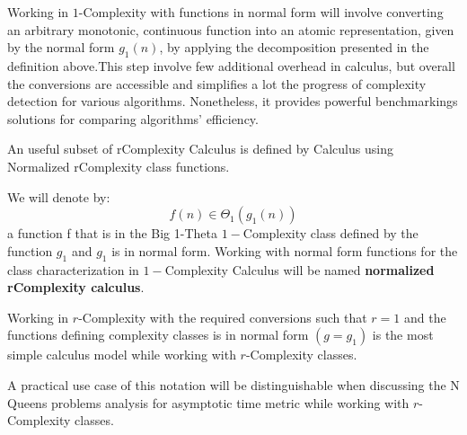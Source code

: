 \begin{remark}
Working in $1$-Complexity with functions in normal form will involve converting an arbitrary monotonic, continuous function into an atomic representation, given by the normal form $g_{1}(n)$, by applying the decomposition presented in the definition above.This step involve few additional overhead in calculus, but overall the conversions are accessible and simplifies a lot the progress of complexity detection for various algorithms. Nonetheless, it provides powerful benchmarkings solutions for comparing algorithms' efficiency. 
\end{remark}

An useful subset of rComplexity Calculus is defined by Calculus using Normalized rComplexity class functions.
\begin{definition}
We will denote by: 
\[ f(n) \in \Theta_{1}(g_{1}(n)) \]
a function f that is in the Big 1-Theta $1-$Complexity class defined by the function $g_{1}$ and $g_{1}$ is in normal form. Working with normal form functions for the class characterization in $1-$Complexity Calculus will be named \textbf{normalized rComplexity calculus}.
\end{definition}

\begin{remark}
Working in $r$-Complexity with the required conversions such that $r = 1$ and the functions defining complexity classes is in normal form $(g = g_{1})$ is the most simple
calculus model while working with $r$-Complexity classes.
\end{remark}


\begin{remark}
A practical use case of this notation will be distinguishable when discussing the N Queens problems analysis for asymptotic time metric while working with $r$-Complexity classes.
\end{remark}